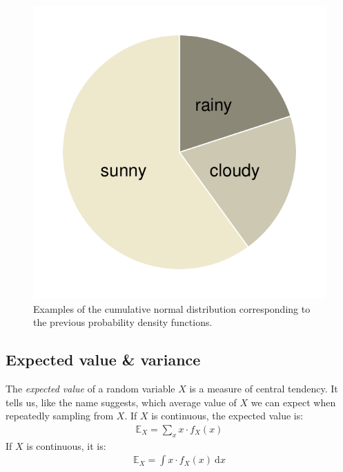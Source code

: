 \documentclass[nobib,nofonts]{tufte-handout}
\renewcommand{\markdef}[1]{\emph{#1}}
\newcommand{\mult}{\ensuremath{\cdot}}
\begin{document}
\begin{example}
\begin{figure}
  \centering
  \includegraphics[width=\textwidth]{00-pics/05_01_normal-distribution-cumulative.pdf}
  \caption{Examples of the cumulative normal distribution corresponding to the previous probability
    density functions.}
  \label{fig:NormalDistributionCumulative}
\end{figure}

\end{example}

\subsection{Expected value \& variance}

The \markdef{expected value} of a random variable $X$ is a measure of central tendency. It
tells us, like the name suggests, which average value of $X$ we can expect when repeatedly
sampling from $X$. If $X$ is continuous, the expected value is:
\begin{align*}
  \mathds{E}_X = \sum_{x} x \mult f_X(x)
\end{align*}
If $X$ is continuous, it is:
\begin{align*}
  \mathds{E}_X = \int x \mult f_X(x) \ \text{d}x
\end{align*}
\end{document}

